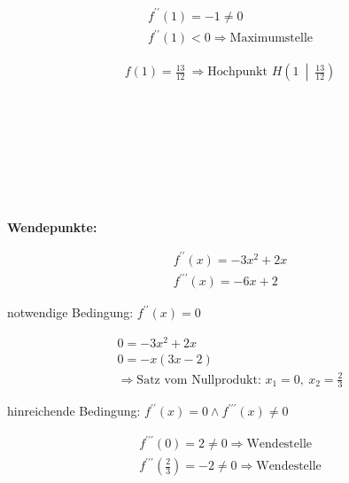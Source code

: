\begin{equation*}
    \begin{gathered}
        f^{\prime\prime}(1) = -1 \neq 0 \\
        f^{\prime\prime}(1) < 0 \Rightarrow \text{Maximumstelle}
    \end{gathered}
\end{equation*}

\begin{equation*}
    \begin{gathered}
        f(1) = \frac{13}{12} \ \Rightarrow \text{Hochpunkt } H\left(1 \ \middle| \ \frac{13}{12}\right)
    \end{gathered}
\end{equation*}

\ \\
\ \\
\ \\
\ \\
\ \\
\ \\
\ \\

\textbf{Wendepunkte:}

\begin{equation*}
    \begin{gathered}
        f^{\prime\prime}(x)=-3x^2 + 2x \\
        f^{\prime\prime\prime}(x) = -6x + 2
    \end{gathered}
\end{equation*}

notwendige Bedingung: $f^{\prime\prime}(x)=0$

\begin{equation*}
    \begin{gathered}
        0 = -3x^2 + 2x \\
        0 = -x(3x-2) \\
        \Rightarrow \text{Satz vom Nullprodukt: } x_1 = 0, \ x_2 = \frac{2}{3}
    \end{gathered}
\end{equation*}

hinreichende Bedingung: $f^{\prime\prime}(x)=0 \land f^{\prime\prime\prime}(x) \neq 0$

\begin{equation*}
    \begin{gathered}
        f^{\prime\prime\prime}(0)= 2 \neq 0 \Rightarrow \text{Wendestelle} \\
        f^{\prime\prime\prime}\left(\frac{2}{3}\right)= -2 \neq 0 \Rightarrow \text{Wendestelle}
    \end{gathered}
\end{equation*}

